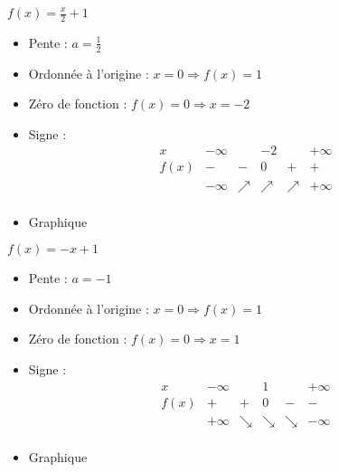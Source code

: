 \begin{solution}
$f(x)=\frac{x}{2}+1$
\begin{itemize}
\item Pente :	$a=\frac{1}{2}$
\item Ordonnée à l’origine :	$x=0\Rightarrow f(x)=1$
\item Zéro de fonction :	$f(x)=0\Rightarrow x=-2$
\item Signe :	
$$\begin{array}{l|l|l|l|l|l}
x    & -\infty &   & -2 &   & +\infty \\
\hline
f(x) & -       & - & 0  & + & +   \\
 & -\infty & \nearrow & \nearrow & \nearrow & +\infty \\   
\end{array}$$
\item Graphique
\end{itemize}
\end{solution}

\begin{solution}
$f(x)=-x+1$
\begin{itemize}
\item Pente :	$a=-1$
\item Ordonnée à l’origine :	$x=0\Rightarrow f(x)=1$
\item Zéro de fonction :	$f(x)=0\Rightarrow x=1$
\item Signe :
$$\begin{array}{l|l|l|l|l|l}
x    & -\infty &   & 1 &   & +\infty \\
\hline
f(x) & +       & + & 0  & - & -   \\
 & +\infty & \searrow & \searrow & \searrow & -\infty \\   
\end{array}$$
\item Graphique
\end{itemize}
\end{solution}

